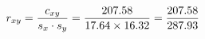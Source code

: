 \documentclass[preview]{standalone}
\begin{document}
\begin{align*}
\special{dvisvgm:raw <g id='unique000'>}r_{xy} = \frac{c_{xy}}{s_x \cdot s_y} = \frac{207.58}{17.64 \times 16.32} = \frac{207.58}{287.93}\special{dvisvgm:raw </g>}
\end{align*}
\end{document}
